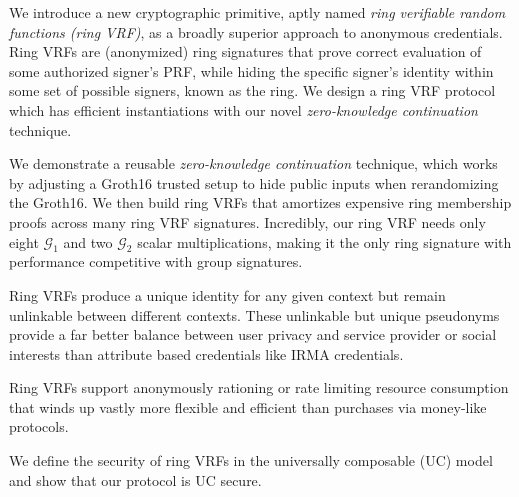 
\def\eprintsmallskip{\smallskip}{}%
We introduce a new cryptographic primitive, aptly named
 \emph{ring verifiable random functions (ring VRF)},
 as a broadly superior approach to anonymous credentials.
Ring VRFs are (anonymized) ring signatures that prove correct evaluation
of some authorized signer's PRF, while hiding the specific signer's
identity within some set of possible signers, known as the ring. We design a ring VRF protocol which has efficient instantiations with our novel {\em zero-knowledge continuation} technique.

\eprintsmallskip
We demonstrate a reusable {\em zero-knowledge continuation} technique,
which works by adjusting a Groth16 trusted setup to hide public inputs
when rerandomizing the Groth16.  We then build ring VRFs that amortizes
expensive ring membership proofs across many ring VRF signatures.
%
Incredibly, our ring VRF needs only eight $\mathcal{G}_1$ and two
$\mathcal{G}_2$ scalar multiplications, making it the only ring signature
with performance competitive with group signatures.

\eprintsmallskip
Ring VRFs produce a unique identity for any given context but remain
unlinkable between different contexts.  These unlinkable but unique
pseudonyms provide a far better balance between user privacy and service
provider or social interests than attribute based credentials like IRMA credentials.

\eprintsmallskip
Ring VRFs support anonymously rationing or rate limiting resource
consumption that winds up vastly more flexible and efficient than
purchases via money-like protocols.

\eprintsmallskip
We define the security of ring VRFs in the universally composable (UC) model and show that our protocol is UC secure.
